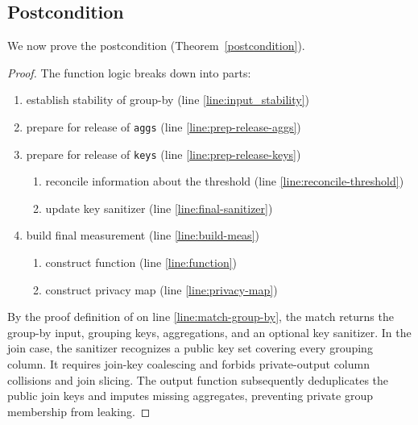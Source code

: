 \documentclass{article}
\begin{document}
\subsection*{Postcondition}
\begin{theorem}
    \label{postcondition}
\end{theorem}
We now prove the postcondition (Theorem~\ref{postcondition}).
\begin{proof}

The function logic breaks down into parts:
\begin{enumerate}
    \item establish stability of group-by (line \ref{line:input_stability})
    \item prepare for release of \texttt{aggs} (line \ref{line:prep-release-aggs})
    \item prepare for release of \texttt{keys} (line \ref{line:prep-release-keys})
    \begin{enumerate}
        \item reconcile information about the threshold (line \ref{line:reconcile-threshold})
        \item update key sanitizer (line \ref{line:final-sanitizer})
    \end{enumerate}
    \item build final measurement (line \ref{line:build-meas})
    \begin{enumerate}
        \item construct function (line \ref{line:function})
        \item construct privacy map (line \ref{line:privacy-map})
    \end{enumerate}
\end{enumerate}

By the proof definition of  on line \ref{line:match-group-by},
the match returns the group-by input, grouping keys, aggregations, and an optional key sanitizer.
In the join case, the sanitizer recognizes a public key set covering every grouping
column. It requires join-key coalescing and forbids private-output column collisions and
join slicing. The output function subsequently deduplicates the public join keys
and imputes missing aggregates, preventing private group membership from leaking.


\end{proof}
\end{document}
